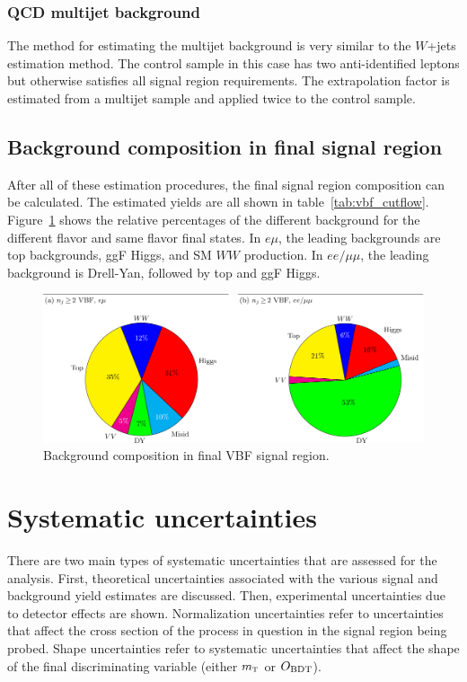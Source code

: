 \subsubsection{QCD multijet background}

The method for estimating the multijet background is very similar to the $W$+jets estimation method. The control sample in this case has two anti-identified leptons but otherwise satisfies all signal region requirements. The extrapolation factor is estimated from a multijet sample and applied twice to the control sample. 

\subsection{Background composition in final signal region}

After all of these estimation procedures, the final signal region composition can be calculated. The estimated yields are all shown in table~\ref{tab:vbf_cutflow}. Figure~\ref{fig:VBF_bkg_comp} shows the relative percentages of the different background for the different flavor and same flavor final states. In $e\mu$, the leading backgrounds are top backgrounds, ggF Higgs, and SM $WW$ production. In $ee/\mu\mu$, the leading background is Drell-Yan, followed by top and ggF Higgs.


\begin{figure}[h!]
  \centering
  \captionsetup{justification=centering}
  \includegraphics[width=\textwidth]{figures/VBF_bkg_comp}
  \caption{Background composition in final VBF signal region\cite{WW2015}.}
  \label{fig:VBF_bkg_comp}
\end{figure}

\section{Systematic uncertainties}

There are two main types of systematic uncertainties that are assessed for the analysis. First, theoretical uncertainties associated with the various signal and background yield estimates are discussed. Then, experimental uncertainties due to detector effects are shown. Normalization uncertainties refer to uncertainties that affect the cross section of the process in question in the signal region being probed. Shape uncertainties refer to systematic uncertainties that affect the shape of the final discriminating variable (either $m_{\textrm{\footnotesize\sc t}}$ or $O_{\rm BDT}$). 

